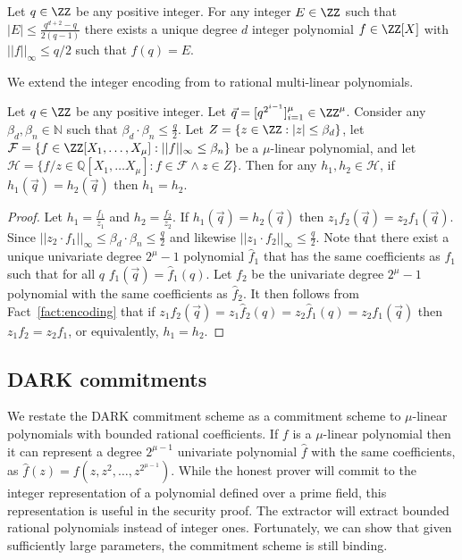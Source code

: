 \begin{fact}
\label{fact:encoding}
Let $q \in \ZZ$ be any positive integer. For any integer $E \in \ZZ$ such that $|E|\leq \frac{q^{d+2} - q}{2(q-1)}$ there exists a unique degree $d$ integer polynomial $f \in \ZZ[X]$ with $||f||_\infty \leq q/2$ such that $f(q) = E$. 
\end{fact} 

We extend the integer encoding from  to rational multi-linear polynomials.
\begin{lemma}
\label{lem:encoding}
Let $q \in \ZZ$ be any positive integer. Let $\vec{q}=[q^{2^{i-1}}]_{i=1}^\mu \in \ZZ^\mu$. Consider any $\beta_d, \beta_n \in \mathbb{N}$ such that $\beta_d \cdot \beta_n\leq \frac{q}{2}$. Let $Z = \{z \in \ZZ: |z| \leq \beta_d \}$, let $\mathcal{F} = \{ f \in \ZZ[X_1,\dots,X_\mu]: ||f||_\infty \leq \beta_n\}$ be a $\mu$-linear polynomial, and let $\mathcal{H} = \{f/z \in \mathbb{Q}[X_1,\dots X_\mu]: f \in \mathcal{F} \wedge z \in Z \}$. Then for any $h_1, h_2 \in \mathcal{H}$,  if $h_1(\vec{q}) = h_2(\vec{q})$ then $h_1 = h_2$. 
\end{lemma}
\begin{proof}
Let $h_1 = \frac{f_1}{z_1}$ and $h_2 = \frac{f_2}{z_2}$. If $h_1(\vec{q}) = h_2(\vec{q})$ then $z_1 f_2(\vec{q}) = z_2 f_1(\vec{q})$. Since $||z_2 \cdot f_1||_\infty \leq \beta_d \cdot \beta_n \leq \frac{q}{2}$ and  likewise $||z_1\cdot f_2||_\infty \leq \frac{q}{2}$. Note that there exist a unique univariate degree $2^\mu-1$ polynomial $\hat{f}_1$ that has the same coefficients as $f_1$ such that for all $q$ $f_1(\vec{q})=\hat{f}_1(q)$. Let $f_2$ be the univariate degree $2^\mu-1$ polynomial with the same coefficients as $\hat{f}_2$. It then follows from Fact~\ref{fact:encoding} that if $z_1 f_2(\vec{q})=z_1\hat{f}_2(q) = z_2 \hat{f}_1(q)= z_2 f_1(\vec{q})$ then $z_1 f_2 = z_2 f_1$, or equivalently, $h_1 = h_2$.
\end{proof}


\subsection{DARK commitments} 
We restate the DARK commitment scheme as a commitment scheme to $\mu$-linear polynomials with bounded rational coefficients. If $f$ is a $\mu$-linear polynomial then it can represent a degree $2^{\mu-1}$ univariate polynomial $\hat{f}$ with the same coefficients, as $\hat{f}(z)=f(z,z^2,\dots,z^{2^{\mu-1}})$. 
While the honest prover will commit to the integer representation of a polynomial defined over a prime field, this representation is useful in the security proof. The extractor will extract bounded rational polynomials instead of integer ones. Fortunately, we can show that given sufficiently large parameters, the commitment scheme is still binding.

